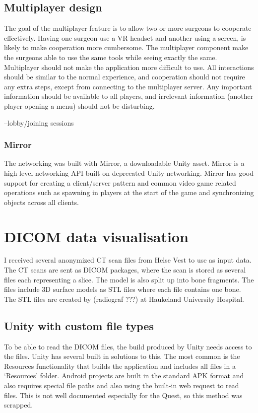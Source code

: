 \documentclass[a4paper]{report}
\begin{document}
\subsection{Multiplayer design}
The goal of the multiplayer feature is to allow two or more surgeons to cooperate effectively. Having one surgeon use a VR headset and another using a screen, is likely to make cooperation more cumbersome. The multiplayer component make the surgeons able to use the same tools while seeing exactly the same.
Multiplayer should not make the application more difficult to use. All interactions should be similar to the normal experience, and cooperation should not require any extra steps, except from connecting to the multiplayer server. Any important information should be available to all players, and irrelevant information (another player opening a menu) should not be disturbing.

--lobby/joining sessions

\subsubsection{Mirror}
The networking was built with Mirror, a downloadable Unity asset. Mirror is a high level networking API built on deprecated Unity networking\cite{noauthor_mirror_nodate}. Mirror has good support for creating a client/server pattern and common video game related operations such as spawning in players at the start of the game and synchronizing objects across all clients.

\section{DICOM data visualisation}
I received several anonymized CT scan files from Helse Vest to use as input data. The CT scans are sent as DICOM packages\cite{noauthor_dicom_nodate}, where the scan is stored as several files each representing a slice.
The model is also split up into bone fragments. The files include 3D surface models as STL files where each file contains one bone. The STL files are created by (radiograf ???) at Haukeland University Hospital.


\subsection{Unity with custom file types}

To be able to read the DICOM files, the build produced by Unity needs access to the files. Unity has several built in solutions to this.
The most common is the Resources functionality\cite{resourcesload_unity_nodate} that builds the application and includes all files in a `Resources' folder. Android projects are built in the standard APK format and also requires special file paths and also using the built-in web request to read files. This is not well documented especially for the Quest, so this method was scrapped.
\end{document}
